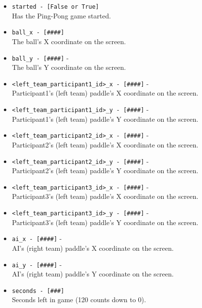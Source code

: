 \begin{description}
\begin{addmargin}[0em]{0em}
\begin{addmargin}[1em]{0em}
\begin{itemize}
                \item \verb|started - [False or True]|\\Has the Ping-Pong game started.
                \item \verb|ball_x - [####]|\\The ball's X coordinate on the screen.
                \item \verb|ball_y - [####]| - \\The ball's Y coordinate on the screen.
                \item \verb|<left_team_participant1_id>_x - [####]| -\\Participant1's (left team) paddle's X coordinate on the screen.
                \item \verb|<left_team_participant1_id>_y - [####]| -\\Participant1's (left team) paddle's Y coordinate on the screen.
                \item \verb|<left_team_participant2_id>_x - [####]| -\\Participant2's (left team) paddle's X coordinate on the screen.
                \item \verb|<left_team_participant2_id>_y - [####]| -\\Participant2's (left team) paddle's Y coordinate on the screen.
                \item \verb|<left_team_participant3_id>_x - [####]| -\\Participant3's (left team) paddle's X coordinate on the screen.
                \item \verb|<left_team_participant3_id>_y - [####]| -\\Participant3's (left team) paddle's Y coordinate on the screen.
                \item \verb|ai_x - [####]| -\\AI's (right team) paddle's X coordinate on the screen.
                \item \verb|ai_y - [####]| -\\AI's (right team) paddle's Y coordinate on the screen.
                \item \verb|seconds - [###]|\\Seconds left in game (120 counts down to 0).
            \end{itemize}
        \end{addmargin} %



\end{addmargin}
\end{description}
